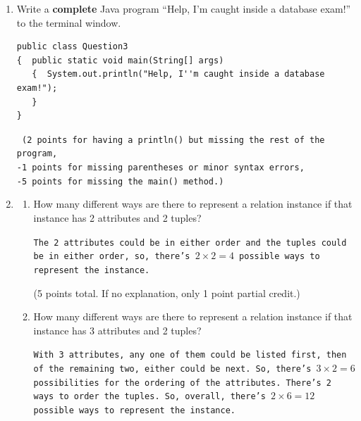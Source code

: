 \documentclass[12pt]{article}
\begin{document}
\begin{enumerate}
\begin{enumerate}
{	(5 points total, partial credit (2 points) for relevant, but not completely correct answer.)
	}
    \item What is the difference between a functional dependency and multivalued dependency?
     	\\
	{\tt A functional dependency says that if two tuples of a relation which agree on some
	particular set of attributes must also agree on some other particular attributes.  A 
	multivalued dependency is a weaker condition that says if two tuples of a relation 
	agree on a particular set of attributes then all possible combinations of this particular
	set (the left hand side of the dependency) and another particular set of attributes
	(the right hand side).
	
	(5 points total, partial credit (2 points) for relevant, but not completely correct answer).}

\end{enumerate}

\item Write a {\bf complete} Java program ``Help, I'm caught inside a database exam!'' to
the terminal window.

\begin{verbatim}
public class Question3
{  public static void main(String[] args)
   {  System.out.println("Help, I''m caught inside a database exam!");
   }
}\end{verbatim}

{\tt 
(2 points for having a println() but missing the rest of the program,\\
-1 points for missing parentheses or minor syntax errors,\\
-5 points for missing the main() method.)
}
\item 
  \begin{enumerate}
     \item How many different ways are there to represent a relation instance if that 
        instance has 2 attributes and 2 tuples?
	\\
	{\tt The 2 attributes could be in either order and the tuples could be in either
	order, so, there's $2\times 2 = 4$ possible ways to represent the instance.
	
	(5 points total.  If no explanation, only 1 point partial credit.)
	}
	
     \item How many different ways are there to represent a relation instance if that 
        instance has 3 attributes and 2 tuples?
	\\
	{\tt With 3 attributes, any one of them could be listed first, then of the 
	remaining two, either could be next.  
	So, there's $3\times 2 = 6$ possibilities for the 
	ordering of the attributes.  There's 2 ways to order the tuples.  So, overall,
	there's $2\times 6 = 12$ possible ways to represent the instance.
	
}
\end{enumerate}
\end{enumerate}
\end{document}
